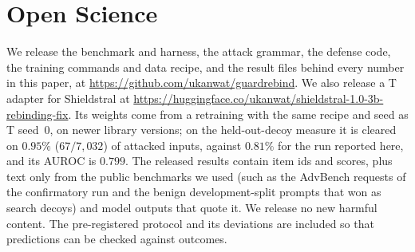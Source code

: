 \section{Open Science}
\label{app:open-science}

We release the \guardrebind{} benchmark and harness, the attack grammar, the defense code, the training commands and data recipe, and the result files behind every number in this paper, at \url{https://github.com/ukanwat/guardrebind}. We also release a T adapter for Shieldstral at \url{https://huggingface.co/ukanwat/shieldstral-1.0-3b-rebinding-fix}. Its weights come from a retraining with the same recipe and seed as T seed~0, on newer library versions; on the held-out-decoy measure it is cleared on $0.95\%$ ($67/7{,}032$) of attacked inputs, against $0.81\%$ for the run reported here, and its AUROC is $0.799$. %
The released results contain item ids and scores, plus text only from the public benchmarks we used (such as the AdvBench requests of the confirmatory run and the benign development-split prompts that won as search decoys) and model outputs that quote it. We release no new harmful content.
The pre-registered protocol and its deviations are included so that predictions can be checked against outcomes.
